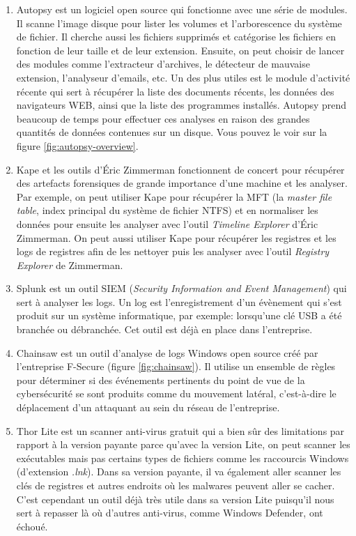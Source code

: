 \begin{enumerate}
    \item Autopsy est un logiciel open source qui fonctionne avec une série de modules. Il scanne l'image disque pour lister les volumes et l'arborescence du système de fichier. Il cherche aussi les fichiers supprimés et catégorise les fichiers en fonction de leur taille et de leur extension. Ensuite, on peut choisir de lancer des modules comme l'extracteur d'archives, le détecteur de mauvaise extension, l'analyseur d'emails, etc. Un des plus utiles est le module d'activité récente qui sert à récupérer la liste des documents récents, les données des navigateurs WEB, ainsi que la liste des programmes installés. Autopsy prend beaucoup de temps pour effectuer ces analyses en raison des grandes quantités de données contenues sur un disque. Vous pouvez le voir sur la figure \ref{fig:autopsy-overview}.
    \item Kape et les outils d'Éric Zimmerman fonctionnent de concert pour récupérer des artefacts forensiques de grande importance d'une machine et les analyser. Par exemple, on peut utiliser Kape pour récupérer la MFT (la \textit{master file table}, index principal du système de fichier NTFS) et en normaliser les données pour ensuite les analyser avec l'outil \textit{Timeline Explorer} d'Éric Zimmerman. On peut aussi utiliser Kape pour récupérer les registres et les logs de registres afin de les nettoyer puis les analyser avec l'outil \textit{Registry Explorer} de Zimmerman.
    \item Splunk est un outil SIEM (\textit{Security Information and Event Management}) qui sert à analyser les logs. Un log est l'enregistrement d'un évènement qui s'est produit sur un système informatique, par exemple: lorsqu'une clé USB a été branchée ou débranchée. Cet outil est déjà en place dans l'entreprise.
    \item Chainsaw est un outil d'analyse de logs Windows open source créé par l'entreprise F-Secure (figure \ref{fig:chainsaw}). Il utilise un ensemble de règles pour déterminer si des événements pertinents du point de vue de la cybersécurité se sont produits comme du mouvement latéral, c'est-à-dire le déplacement d'un attaquant au sein du réseau de l'entreprise.
    \item Thor Lite est un scanner anti-virus gratuit qui a bien sûr des limitations par rapport à la version payante parce qu'avec la version Lite, on peut scanner les exécutables mais pas certains types de fichiers comme les raccourcis Windows (d'extension \textit{.lnk}). Dans sa version payante, il va également aller scanner les clés de registres et autres endroits où les malwares peuvent aller se cacher. C'est cependant un outil déjà très utile dans sa version Lite puisqu'il nous sert à repasser là où d'autres anti-virus, comme Windows Defender, ont échoué.
\end{enumerate}

